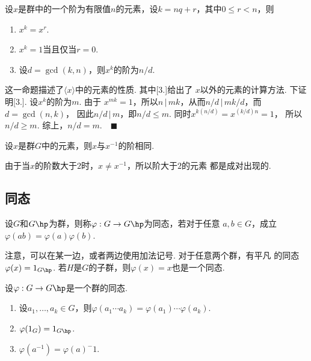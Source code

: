   \begin{pos}
    \label{pos: 循环子群的性质}
    设$x$是群中的一个阶为有限值$n$的元素，设$k=nq+r$，其中$0\le r<n$，则
    \begin{enumerate}
      \item $x^k = x^r$.
      \item $x^k = 1$当且仅当$r=0$.
      \item 设$d=\gcd(k, n)$，则$x^k$的阶为$n/d$.
    \end{enumerate}
  \end{pos}
  \remark
    这一命题描述了$\langle x\rangle$中的元素的性质. 其中[3.]给出了
    $x$以外的元素的计算方法.
  \proof
    下证明[3.]. 设$x^k$的阶为$m$. 由于
    $x^{mk}=1$，所以$n\,|\,mk$，从而$n/d\,|\,mk/d$，而$d=\gcd(n, k)$，
    因此$n/d\,|\, m$，即$n/d \le m$. 同时$x^{k(n/d)} = x^{(k/d)n}=1$，
    所以$n/d \ge m$. 综上，$n/d = m$.$\quad\blacksquare$

  \begin{pos}[逆元的阶]
    \label{pos: 逆元的阶}
    设$x$是群$G$中的元素，则$x$与$x^{-1}$的阶相同.
  \end{pos}
  \remark
    由于当$x$的阶数大于$2$时，$x\ne x^{-1}$，所以阶大于$2$的元素
    都是成对出现的.

\subsection{同态}

  \begin{defi}
    设$G$和$G\hp$为群，则称$\varphi:G\to G\hp$为同态，若对于任意
    $a, b\in G$，成立$\varphi(ab) = \varphi(a)\varphi(b)$.
  \end{defi}
  \remark
    注意，可以在某一边，或者两边使用加法记号. 对于任意两个群，有平凡
    的同态$\varphi(x) = 1_{G\hp}$. 若$H$是$G$的子群，则$\varphi(x)
    =x$也是一个同态.

  \begin{thm}
    设$\varphi: G\to G\hp$是一个群的同态.
    \begin{enumerate}
      \item 设$a_1,\dots, a_k\in G$，则$\varphi(a_1\cdots a_k)
        =\varphi(a_1)\cdots\varphi(a_k)$.
      \item $\varphi(1_G) = 1_{G\hp}$.
      \item $\varphi(a^{-1}) = \varphi(a)^-1$.
    \end{enumerate}
  \end{thm}

